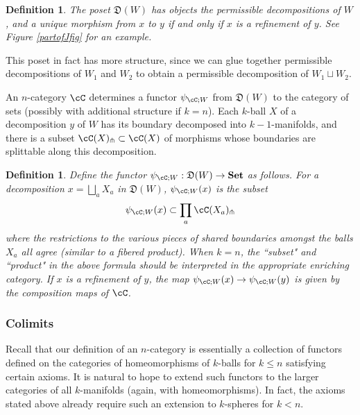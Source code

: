 \documentclass{pnastwo}
\newcommand{\Set}{\text{\textbf{Set}}}
\newcommand{\cell}{\mathfrak{D}}
\def\spl{_\pitchfork}
\newtheorem{defn}[prop]{Definition}
\begin{document}
\begin{article}
\begin{defn}
The poset $\cell(W)$ has objects the permissible decompositions of $W$, 
and a unique morphism from $x$ to $y$ if and only if $x$ is a refinement of $y$.
See Figure \ref{partofJfig} for an example.
\end{defn}

This poset in fact has more structure, since we can glue together permissible decompositions of 
$W_1$ and $W_2$ to obtain a permissible decomposition of $W_1 \sqcup W_2$. 

An $n$-category $\cC$ determines 
a functor $\psi_{\cC;W}$ from $\cell(W)$ to the category of sets 
(possibly with additional structure if $k=n$).
Each $k$-ball $X$ of a decomposition $y$ of $W$ has its boundary decomposed into $k{-}1$-manifolds,
and there is a subset $\cC(X)\spl \subset \cC(X)$ of morphisms whose boundaries
are splittable along this decomposition.

\begin{defn}
Define the functor $\psi_{\cC;W} : \cell(W) \to \Set$ as follows.
For a decomposition $x = \bigsqcup_a X_a$ in $\cell(W)$, $\psi_{\cC;W}(x)$ is the subset
\begin{equation*}
	\psi_{\cC;W}(x) \subset \prod_a \cC(X_a)\spl
\end{equation*}
where the restrictions to the various pieces of shared boundaries amongst the balls
$X_a$ all agree (similar to a fibered product). 
When $k=n$, the ``subset" and ``product" in the above formula should be 
interpreted in the appropriate enriching category.
If $x$ is a refinement of $y$, the map $\psi_{\cC;W}(x) \to \psi_{\cC;W}(y)$ is given by the composition maps of $\cC$.
\end{defn}



\subsubsection{Colimits}
Recall that our definition of an $n$-category is essentially a collection of functors
defined on the categories of homeomorphisms of $k$-balls
for $k \leq n$ satisfying certain axioms. 
It is natural to hope to extend such functors to the 
larger categories of all $k$-manifolds (again, with homeomorphisms). 
In fact, the axioms stated above already require such an extension to $k$-spheres for $k<n$.


\end{article}
\end{document}
